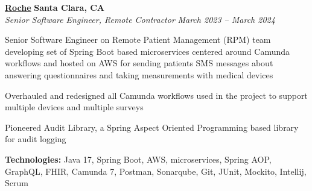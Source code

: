 %
    \headerrow
        {\textbf{\href{https://www.roche.com/}{Roche}}}
        {\textbf{Santa Clara, CA}}
    \\
    \headerrow
        {\emph{Senior Software Engineer, Remote Contractor}}
        {\emph{March 2023 -- March 2024}}
    \begin{itemize*}
        \item Senior Software Engineer on Remote Patient Management (RPM) team developing set of Spring Boot based microservices centered around Camunda workflows and hosted on AWS for sending patients SMS messages about answering questionnaires and taking measurements with medical devices
        \item Overhauled and redesigned all Camunda workflows used in the project to support multiple devices and multiple surveys
        \item Pioneered Audit Library, a Spring Aspect Oriented Programming based library for audit logging
    \end{itemize*}

    \hspace{1.0em}
        {\textbf{Technologies:} Java 17, Spring Boot, AWS, microservices, Spring AOP, GraphQL, FHIR, Camunda 7, Postman, Sonarqube, Git, JUnit, Mockito, Intellij, Scrum}

